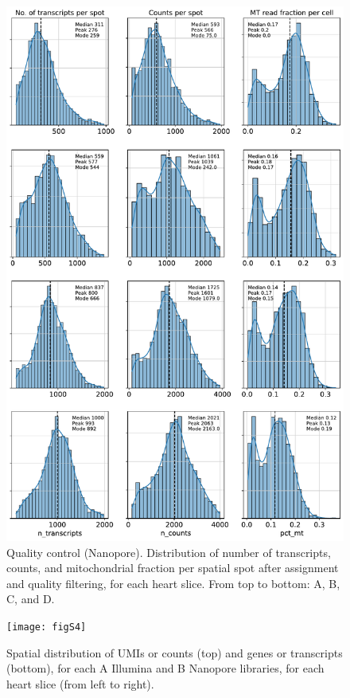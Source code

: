\documentclass[utf8]{frontiers_suppmat} %
\begin{document}
\begin{figure}[htbp]
\begin{center}
\includegraphics[width=.75\textwidth]{figS3}%
\end{center}
\caption{Quality control (Nanopore). Distribution of number of transcripts, counts, and mitochondrial fraction per spatial spot after assignment and quality filtering, for each heart slice. From top to bottom: A, B, C, and D.}\label{fig:S3}
\end{figure}


\begin{figure}[htbp]
\begin{center}
\texttt{[image: figS4]}%
\end{center}
\caption{Spatial distribution of UMIs or counts (top) and genes or transcripts (bottom), for each A Illumina and B Nanopore libraries, for each heart slice (from left to right).}\label{fig:S4}
\end{figure}
\end{document}

